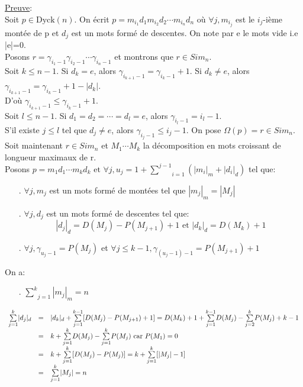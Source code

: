 		\underline{Preuve}:\\
			Soit $ p \in {\text{Dyck}}(n) $. On écrit $ p = m_{i_{1}}d_{1}m_{i_{2}}d_{2} \cdots m_{i_{n}}d_{n} $ où $ \forall j, m_{i_{j}} $ est le $i_{j}$-ième montée de p et $ d_{j} $ est un mots formé de descentes. On note par e le mots vide i.e |e|=0.\\
			Posons $ r = \gamma_{i_{1}-1} \gamma_{i_{2}-1} \cdots \gamma_{i_{n}-1}$ et montrons que $ r \in {Sim_{n}} $.\\ 
			Soit $ k \leq n-1 $. Si $ d_{k} = e $, alors $ \gamma_{i_{k+1}-1} = \gamma_{i_{k}-1} + 1 $. Si $ d_{k} \neq e $, alors $ \gamma_{i_{k+1}-1} = \gamma_{i_{k}-1} + 1 - |d_{k}| $.\\
			D'où $ \gamma_{i_{k+1}-1} \leq \gamma_{i_{k}-1} + 1 $.\\
			Soit $ l \leq n-1 $. Si $ d_{1}=d_{2}=\cdots= d_{l}=e $, alors $ \gamma_{i_{l}-1}=i_{l}-1 $.\\
			S'il existe $ j \leq l$ tel que $ d_{j} \neq e $, alors  $ \gamma_{i_{j}-1} \leq i_{j}-1 $. On pose $ \Omega(p) = r \in {Sim_{n}}$.\\
			Soit maintenant $r \in {Sim_{n}}$ et $ M_{1}\cdots M_{k} $ la décomposition en mots croissant de longueur maximaux de r.\\
			Posons $ p=m_{1}d_{1}\cdots m_{k}d_{k} \text{ et } \forall j, u_{j} = 1+\underset{i=1}{\overset{j-1}{\sum}}(|m_{i}|_{m}+|d_{i}|_{d}) $ tel que: 
			\begin{itemize}
				\item[.] $ \forall j, m_{j} $ est un mots formé de montées tel que $|m_{j}|_{m}=|M_{j}|$
				\item[.] $ \forall j, d_{j} $ est un mots formé de descentes tel que: \[ |d_{j}|_{d}= D(M_{j})-P(M_{j+1})+1 \text{ et } |d_{k}|_{d}= D(M_{k})+1 \]
				\item[.] $ \forall j, \gamma_{u_{j}-1}=P(M_{j}) $ et $ \forall j\leq k-1, \gamma_{(u_{j}-1)-1} = P(M_{j+1})+1 $
			\end{itemize}
			On a:
			\begin{itemize}
				\item[.] $ \underset{j=1}{\overset{k}{\sum}}|m_{j}|_{m} = n$
			\end{itemize}
			$$
			\begin{array}{c c l}
				\underset{j=1}{\overset{k}{\sum}}|d_{j}|_{d} &=& |d_{k}|_{d}+ \underset{j=1}{\overset{k-1}{\sum}}[D(M_{j})-P(M_{j+1})+1]= D(M_{k})+1 + \underset{j=1}{\overset{k-1}{\sum}}D(M_{j}) - \underset{j=2}{\overset{k}{\sum}}P(M_{j}) + k-1\\
				&=& k+ \underset{j=1}{\overset{k}{\sum}}D(M_{j})- \underset{j=1}{\overset{k}{\sum}}P(M_{j}) \text{ car }P(M_{1})=0\\
				&=&k+ \underset{j=1}{\overset{k}{\sum}}[D(M_{j})- P(M_{j})] = k+ \underset{j=1}{\overset{k}{\sum}}[|M_{j}|-1]\\
				&=&\underset{j=1}{\overset{k}{\sum}}|M_{j}|=n
			\end{array}
			$$
